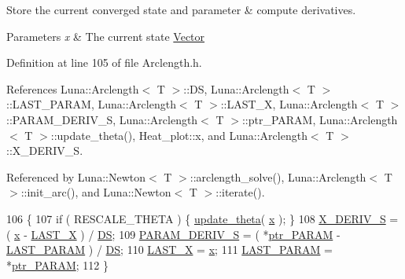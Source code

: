 Store the current converged state and parameter \& compute derivatives. 


\begin{DoxyParams}{Parameters}
{\em x} & The current state \hyperlink{classLuna_1_1Vector}{Vector} \\
\hline
\end{DoxyParams}


Definition at line 105 of file Arclength.\+h.



References Luna\+::\+Arclength$<$ T $>$\+::\+DS, Luna\+::\+Arclength$<$ T $>$\+::\+L\+A\+S\+T\+\_\+\+P\+A\+R\+AM, Luna\+::\+Arclength$<$ T $>$\+::\+L\+A\+S\+T\+\_\+X, Luna\+::\+Arclength$<$ T $>$\+::\+P\+A\+R\+A\+M\+\_\+\+D\+E\+R\+I\+V\+\_\+S, Luna\+::\+Arclength$<$ T $>$\+::ptr\+\_\+\+P\+A\+R\+AM, Luna\+::\+Arclength$<$ T $>$\+::update\+\_\+theta(), Heat\+\_\+plot\+::x, and Luna\+::\+Arclength$<$ T $>$\+::\+X\+\_\+\+D\+E\+R\+I\+V\+\_\+S.



Referenced by Luna\+::\+Newton$<$ T $>$\+::arclength\+\_\+solve(), Luna\+::\+Arclength$<$ T $>$\+::init\+\_\+arc(), and Luna\+::\+Newton$<$ T $>$\+::iterate().


\begin{DoxyCode}
106   \{
107     \textcolor{keywordflow}{if} ( RESCALE\_THETA ) \{ \hyperlink{classLuna_1_1Arclength_a47d02a96d4b0a5112e6b06d3787409b5}{update\_theta}( \hyperlink{namespaceHeat__plot_aa88370c16b85b784ccbde3ed88bc1991}{x} ); \}
108     \hyperlink{classLuna_1_1Arclength_a0108e51178f63927883af0b0022c29ad}{X\_DERIV\_S} = ( \hyperlink{namespaceHeat__plot_aa88370c16b85b784ccbde3ed88bc1991}{x} - \hyperlink{classLuna_1_1Arclength_a6d6ba83245b4dd616d265609a93035a2}{LAST\_X} ) / \hyperlink{classLuna_1_1Arclength_a6797d7b76d3e27c00b9c4c6ab9970405}{DS};
109     \hyperlink{classLuna_1_1Arclength_a5a02856595774b4a96e4d8add5d9baa4}{PARAM\_DERIV\_S} = ( *\hyperlink{classLuna_1_1Arclength_a984cead721a38abf1ab2a489052461e0}{ptr\_PARAM} - \hyperlink{classLuna_1_1Arclength_a98e8241f24a16ea9f12e514d8d8f841b}{LAST\_PARAM} ) / 
      \hyperlink{classLuna_1_1Arclength_a6797d7b76d3e27c00b9c4c6ab9970405}{DS};
110     \hyperlink{classLuna_1_1Arclength_a6d6ba83245b4dd616d265609a93035a2}{LAST\_X} = \hyperlink{namespaceHeat__plot_aa88370c16b85b784ccbde3ed88bc1991}{x};
111     \hyperlink{classLuna_1_1Arclength_a98e8241f24a16ea9f12e514d8d8f841b}{LAST\_PARAM} = *\hyperlink{classLuna_1_1Arclength_a984cead721a38abf1ab2a489052461e0}{ptr\_PARAM};
112   \}
\end{DoxyCode}
\mbox{\label{classLuna_1_1Arclength_a47d02a96d4b0a5112e6b06d3787409b5}} 
